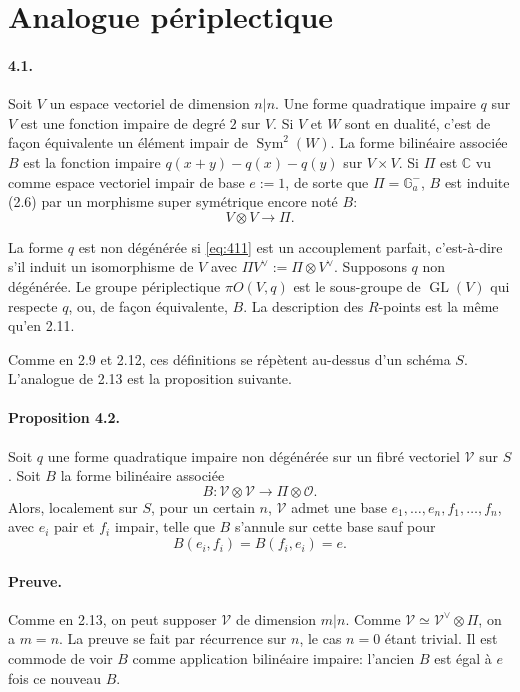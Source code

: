 \documentclass[11pt]{article}
\newcommand{\C}{\mathbb C}
\newcommand{\GL}{\operatorname{GL}}
\newcommand{\Sym}{\operatorname{Sym}}
\newcommand{\Ga}{\mathbb G_a}
\newcommand{\calO}{\mathcal O}
\begin{document}
\section{Analogue périplectique}

\paragraph{4.1.}
Soit $V$ un espace vectoriel de dimension $n|n$. Une forme quadratique impaire $q$ sur $V$ est une fonction impaire de degré $2$ sur $V$. Si $V$ et $W$ sont en dualité, c'est de façon équivalente un élément impair de $\Sym^2(W)$. La forme bilinéaire associée $B$ est la fonction impaire $q(x+y)-q(x)-q(y)$ sur $V\times V$. Si $\Pi$ est $\C$ vu comme espace vectoriel impair de base $e:=1$, de sorte que $\Pi=\Ga^-$, $B$ est induite (2.6) par un morphisme super symétrique encore noté $B$:
\begin{equation}
\label{eq:411}
V\otimes V\longrightarrow \Pi.
\end{equation}

La forme $q$ est non dégénérée si \eqref{eq:411} est un accouplement parfait, c'est-à-dire s'il induit un isomorphisme de $V$ avec $\Pi V^\vee:=\Pi\otimes V^\vee$. Supposons $q$ non dégénérée. Le groupe périplectique $\pi O(V,q)$ est le sous-groupe de $\GL(V)$ qui respecte $q$, ou, de façon équivalente, $B$. La description des $R$-points est la même qu'en 2.11.

Comme en 2.9 et 2.12, ces définitions se répètent au-dessus d'un schéma $S$. L'analogue de 2.13 est la proposition suivante.

\paragraph{Proposition 4.2.}
Soit $q$ une forme quadratique impaire non dégénérée sur un fibré vectoriel $\mathcal V$ sur $S$. Soit $B$ la forme bilinéaire associée
\[
B:\mathcal V\otimes\mathcal V\longrightarrow\Pi\otimes\calO.
\]
Alors, localement sur $S$, pour un certain $n$, $\mathcal V$ admet une base $e_1,\ldots,e_n,f_1,\ldots,f_n$, avec $e_i$ pair et $f_i$ impair, telle que $B$ s'annule sur cette base sauf pour
\[
B(e_i,f_i)=B(f_i,e_i)=e.
\]

\paragraph{Preuve.}
Comme en 2.13, on peut supposer $\mathcal V$ de dimension $m|n$. Comme $\mathcal V\simeq\mathcal V^\vee\otimes\Pi$, on a $m=n$. La preuve se fait par récurrence sur $n$, le cas $n=0$ étant trivial. Il est commode de voir $B$ comme application bilinéaire impaire: l'ancien $B$ est égal à $e$ fois ce nouveau $B$.
\end{document}
